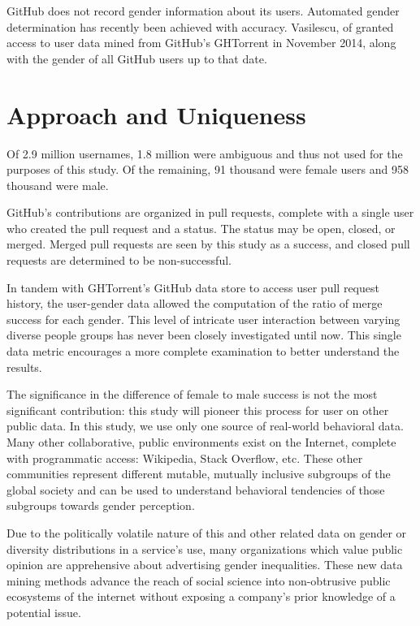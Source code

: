 \documentclass{sigplanconf}
\begin{document}
GitHub does not record gender information about its users. Automated gender
determination has recently been achieved with accuracy. \cite{VasilescuIWC13}
Vasilescu, of \cite{VasilescuIWC13} granted access to user data mined from GitHub's GHTorrent in November 2014,
along with the gender of all GitHub users up to that date.

\section{Approach and Uniqueness}

Of 2.9 million usernames, 1.8 million were ambiguous and thus
not used for the purposes of this study. Of the remaining, 91 thousand were
female users and 958 thousand were male.

GitHub's contributions are organized in pull requests, complete with a single
user who created the pull request and a status. The status may be open, closed,
or merged. Merged pull requests are seen by this study as a success, and closed pull
requests are determined to be non-successful.

In tandem with GHTorrent's GitHub data store to
access user pull request history, the user-gender data allowed the computation of
the ratio of merge success for each gender. This level of intricate user interaction
between varying diverse people groups has never been closely investigated until
now. This single data metric encourages a more complete examination to better
understand the results.

The significance in the difference of female to male success is not the most
significant contribution: this study will pioneer this process for user on other public data.
In this study, we use only one source of real-world behavioral data.
Many other collaborative, public environments exist on the Internet, complete
with programmatic access: Wikipedia, Stack Overflow, etc. These other
communities represent different mutable, mutually inclusive subgroups of the global
society and can be used to understand behavioral tendencies of those subgroups
towards gender perception.

Due to the politically volatile nature of this and other related data on gender
or diversity distributions in a service's use, many organizations which value
public opinion are apprehensive about advertising gender inequalities. These new data
mining methods advance the reach of social science into non-obtrusive public
ecosystems of the internet without exposing a company's prior knowledge of a
potential issue.
\end{document}
